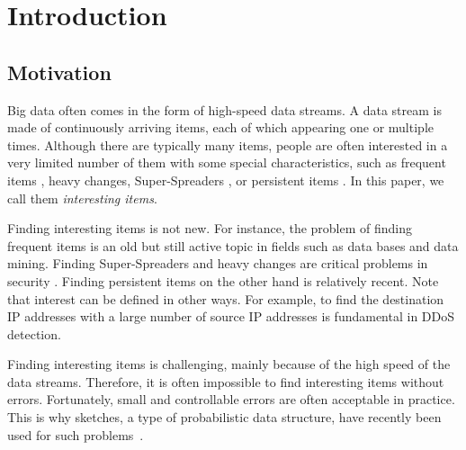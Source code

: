 \vvv\vvv
\presec
\section{Introduction} \postsec
\label{sec:intro}
\uuu
\subsection{Motivation} \postsub

%
%
%
%


Big data often comes in the form of high-speed data streams.
%
%
A data stream is made of continuously arriving items, each of which appearing one or multiple times.
%
Although there are typically many items, people are often interested in a very limited number of them with some special characteristics, such as frequent items \cite{frequent,frequent2,frequentstream,countsketch}, heavy changes\cite{kary,revsketch, flowradar},  Super-Spreaders \cite{superspreader}, or persistent items \cite{persistentsketch,persisitem}.
In this paper, we call them \textit{interesting items}.

Finding interesting items is not new. For instance, the problem of finding frequent items is an old but still active topic in fields such as data bases and data mining. Finding Super-Spreaders and heavy changes are critical problems in security \cite{security}. Finding persistent items on the other hand is relatively recent. Note that interest can be defined in other ways. For example, to find the destination IP addresses with a large number of source IP addresses is fundamental in DDoS detection. 

Finding interesting items is challenging, mainly because of the high speed of the data streams.
%
Therefore, it is often impossible to find interesting items without errors.
%
Fortunately, small and controllable errors are often acceptable in practice.
%
This is why sketches, a type of probabilistic data structure, have recently been used for such problems~\cite{asketch,opensketch,unbiasedsketch,coldfilter,gsketch,persistentsketch}.


